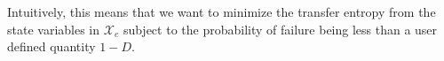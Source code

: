 Intuitively, this means that we want to minimize the transfer entropy from the state variables in $\mathcal{X}_e$ subject to the probability of failure being less than a user defined quantity $1-D$.


